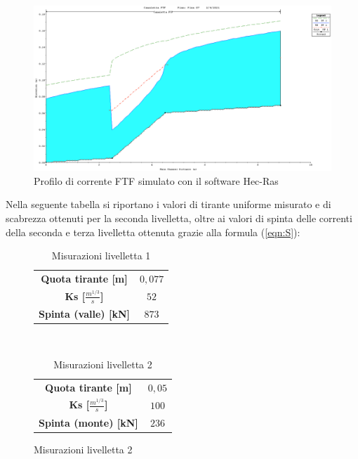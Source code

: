 \documentclass[12pt]{article} %
\begin{document}
\begin{figure}[H]
    \centering
    \includegraphics[scale=0.35]{FTF ks110.png}
    \caption{Profilo di corrente FTF simulato con il software Hec-Ras}
\end{figure}

\noindent Nella seguente tabella si riportano i valori di tirante uniforme misurato e di scabrezza ottenuti per la seconda livelletta, oltre ai valori di spinta delle correnti della seconda e terza livelletta ottenuta grazie alla formula (\ref{eqn:S}):


\begin{figure}[H]
\begin{minipage}[b]{8.5cm}
\begin{table}[H]
    \centering
    \begin{tabular}{|c|c|}
        \hline
        \textbf{Quota tirante [m]} & $0,077$ \\
        \textbf{Ks [$\frac{m^{1/3}}{s}$]} & $52$\\
        \textbf{Spinta (valle) [kN]} & $873$\\
        \hline
    \end{tabular}
    \caption{Misurazioni livelletta 1}
\end{table}
\end{minipage}
\ \hspace{2mm} \hspace{3mm} \
\begin{minipage}[b]{8.5cm}
    \begin{table}[H]
    \centering
    \begin{tabular}{|c|c|}
        \hline
        \textbf{Quota tirante [m]} & $0,05$ \\
        \textbf{Ks [$\frac{m^{1/3}}{s}$]} & $100$\\
        \textbf{Spinta (monte) [kN]} & $236$ \\
        \hline
    \end{tabular}
    \caption{Misurazioni livelletta 2}
\end{table}
\end{minipage}
\end{figure}
\end{document}
